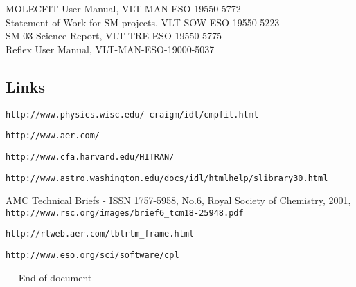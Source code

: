 \documentclass[a4paper,twoside,11pt]{article}
\begin{document}
\begin{thebibliography}{99}
MOLECFIT User Manual, VLT-MAN-ESO-19550-5772\\[0.5cm]

Statement of Work for SM projects, VLT-SOW-ESO-19550-5223\\[0.5cm]

SM-03 Science Report, VLT-TRE-ESO-19550-5775 \\[0.5cm]

Reflex User Manual, VLT-MAN-ESO-19000-5037 \\[0.5cm]

\subsection*{{\hspace{-\leftmargin}}Links}

\texttt{http://www.physics.wisc.edu/~craigm/idl/cmpfit.html}

\texttt{http://www.aer.com/}

\texttt{http://www.cfa.harvard.edu/HITRAN/}

\texttt{http://www.astro.washington.edu/docs/idl/htmlhelp/slibrary30.html}

AMC Technical Briefs - ISSN 1757-5958, No.6, Royal Society of Chemistry,
2001, \texttt{http://www.rsc.org/images/brief6\_tcm18-25948.pdf}

\texttt{http://rtweb.aer.com/lblrtm\_frame.html}

\texttt{http://www.eso.org/sci/software/cpl}

\end{thebibliography}

\centerline{--- End of document ---}            %
\end{document}
